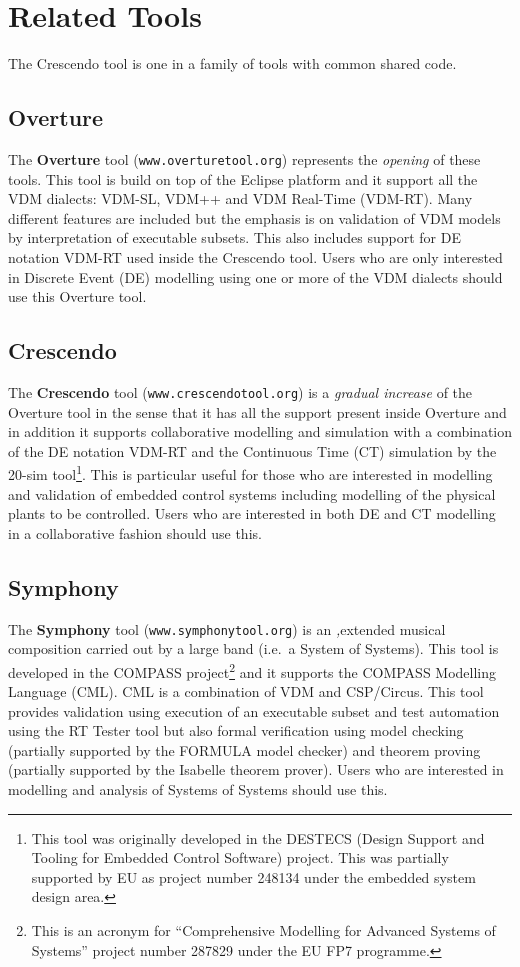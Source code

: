 \documentclass{crescendorepchap}
\newcommand{\url}[1]{\texttt{#1}}
\begin{document}
\section{Related Tools}\label{sec:toolsIntro}

The Crescendo tool is one in a family of tools with common shared code.

\subsection{Overture}

The \textbf{Overture} tool (\url{www.overturetool.org}) represents the \emph{opening} of these tools. This tool is build on top of the Eclipse platform and it support all the VDM dialects: VDM-SL, VDM++ and VDM Real-Time (VDM-RT). Many different features are included but the emphasis is on validation of VDM models by interpretation of executable subsets. This also includes support for DE notation VDM-RT used inside the Crescendo tool. Users who are only interested in Discrete Event (DE) modelling using one or more of the VDM dialects should use this Overture tool.

\subsection{Crescendo}

The \textbf{Crescendo} tool (\url{www.crescendotool.org}) is a \emph{gradual increase} of the Overture tool in the sense that it has all the support present inside Overture and in addition it supports collaborative modelling and simulation with a combination of the DE notation VDM-RT and the Continuous Time (CT) simulation by the 20-sim tool\footnote{This tool was originally developed in the DESTECS (Design Support and Tooling for Embedded Control Software) project. This was partially supported by EU as project number 248134 under the embedded system design area.}. This is particular useful for those who are interested in modelling and validation of embedded control systems including modelling of the physical plants to be controlled. Users who are interested in both DE and CT modelling in a collaborative fashion should use this.

\subsection{Symphony}

The \textbf{Symphony} tool (\url{www.symphonytool.org}) is an \emph,{extended musical composition} carried out by a large band (i.e.\ a System of Systems). This tool is developed in the COMPASS project\footnote{This is an acronym for ``Comprehensive Modelling for Advanced Systems of Systems'' project number 287829 under the EU FP7 programme.} and it supports the COMPASS Modelling Language (CML). CML is a combination of VDM and CSP/Circus. This tool provides validation using execution of an executable subset and test automation using the RT Tester tool but also formal verification using model checking (partially supported by the FORMULA model checker) and theorem proving (partially supported by the Isabelle theorem prover). Users who are interested in modelling and analysis of Systems of Systems should use this.
\end{document}
